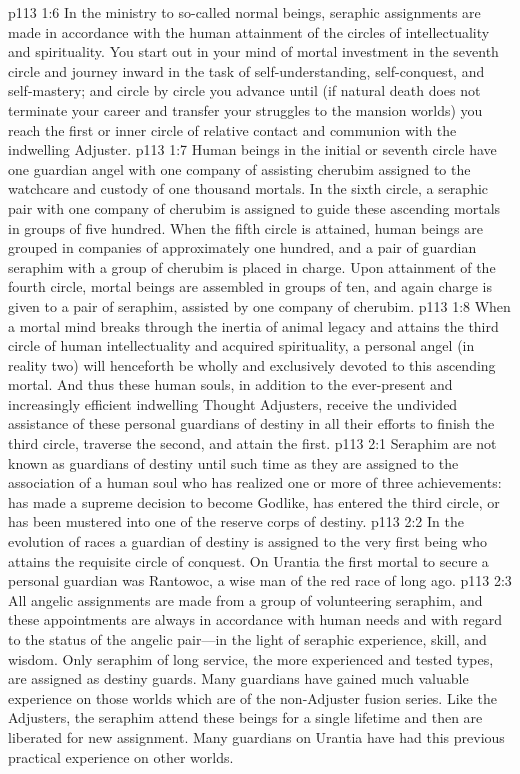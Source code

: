 \pc \vs p113 1:6 In the ministry to so\hyp{}called normal beings, seraphic assignments are made in accordance with the human attainment of the circles of intellectuality and spirituality. You start out in your mind of mortal investment in the seventh circle and journey inward in the task of self\hyp{}understanding, self\hyp{}conquest, and self\hyp{}mastery; and circle by circle you advance until (if natural death does not terminate your career and transfer your struggles to the mansion worlds) you reach the first or inner circle of relative contact and communion with the indwelling Adjuster.
\vs p113 1:7 Human beings in the initial or seventh circle have one guardian angel with one company of assisting cherubim assigned to the watchcare and custody of one thousand mortals. In the sixth circle, a seraphic pair with one company of cherubim is assigned to guide these ascending mortals in groups of five hundred. When the fifth circle is attained, human beings are grouped in companies of approximately one hundred, and a pair of guardian seraphim with a group of cherubim is placed in charge. Upon attainment of the fourth circle, mortal beings are assembled in groups of ten, and again charge is given to a pair of seraphim, assisted by one company of cherubim.\plusone
\vs p113 1:8 When a mortal mind breaks through the inertia of animal legacy and attains the third circle of human intellectuality and acquired spirituality, a personal angel (in reality two) will henceforth be wholly and exclusively devoted to this ascending mortal. And thus these human souls, in addition to the ever\hyp{}present and increasingly efficient indwelling Thought Adjusters, receive the undivided assistance of these personal guardians of destiny in all their efforts to finish the third circle, traverse the second, and attain the first.
\vs p113 2:1 Seraphim are not known as guardians of destiny until such time as they are assigned to the association of a human soul who has realized one or more of three achievements: has made a supreme decision to become Godlike, has entered the third circle, or has been mustered into one of the reserve corps of destiny.
\vs p113 2:2 In the evolution of races a guardian of destiny is assigned to the very first being who attains the requisite circle of conquest. On Urantia the first mortal to secure a personal guardian was Rantowoc, a wise man of the red race of long ago.
\vs p113 2:3 All angelic assignments are made from a group of volunteering seraphim, and these appointments are always in accordance with human needs and with regard to the status of the angelic pair---in the light of seraphic experience, skill, and wisdom. Only seraphim of long service, the more experienced and tested types, are assigned as destiny guards. Many guardians have gained much valuable experience on those worlds which are of the non\hyp{}Adjuster fusion series. Like the Adjusters, the seraphim attend these beings for a single lifetime and then are liberated for new assignment. Many guardians on Urantia have had this previous practical experience on other worlds.
